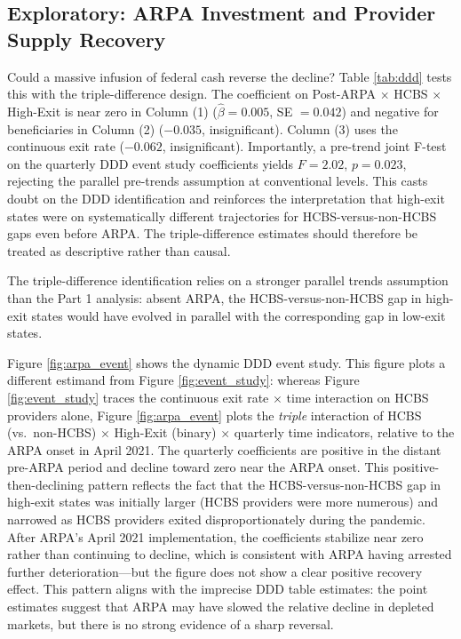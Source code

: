 \documentclass[12pt]{article}
\begin{document}
\subsection{Exploratory: ARPA Investment and Provider Supply Recovery}

Could a massive infusion of federal cash reverse the decline? Table \ref{tab:ddd} tests this with the triple-difference design. The coefficient on Post-ARPA $\times$ HCBS $\times$ High-Exit is near zero in Column (1) ($\hat{\beta} = 0.005$, SE $= 0.042$) and negative for beneficiaries in Column (2) ($-0.035$, insignificant). Column (3) uses the continuous exit rate ($-0.062$, insignificant). Importantly, a pre-trend joint F-test on the quarterly DDD event study coefficients yields $F = 2.02$, $p = 0.023$, rejecting the parallel pre-trends assumption at conventional levels. This casts doubt on the DDD identification and reinforces the interpretation that high-exit states were on systematically different trajectories for HCBS-versus-non-HCBS gaps even before ARPA. The triple-difference estimates should therefore be treated as descriptive rather than causal.



The triple-difference identification relies on a stronger parallel trends assumption than the Part 1 analysis: absent ARPA, the HCBS-versus-non-HCBS gap in high-exit states would have evolved in parallel with the corresponding gap in low-exit states.

Figure \ref{fig:arpa_event} shows the dynamic DDD event study. This figure plots a different estimand from Figure \ref{fig:event_study}: whereas Figure \ref{fig:event_study} traces the continuous exit rate $\times$ time interaction on HCBS providers alone, Figure \ref{fig:arpa_event} plots the \emph{triple} interaction of HCBS (vs.\ non-HCBS) $\times$ High-Exit (binary) $\times$ quarterly time indicators, relative to the ARPA onset in April 2021. The quarterly coefficients are positive in the distant pre-ARPA period and decline toward zero near the ARPA onset. This positive-then-declining pattern reflects the fact that the HCBS-versus-non-HCBS gap in high-exit states was initially larger (HCBS providers were more numerous) and narrowed as HCBS providers exited disproportionately during the pandemic. After ARPA's April 2021 implementation, the coefficients stabilize near zero rather than continuing to decline, which is consistent with ARPA having arrested further deterioration---but the figure does not show a clear positive recovery effect. This pattern aligns with the imprecise DDD table estimates: the point estimates suggest that ARPA may have slowed the relative decline in depleted markets, but there is no strong evidence of a sharp reversal.
\end{document}
